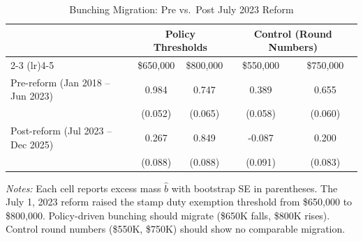 \begin{table}[htbp]
\centering
\begin{threeparttable}
\caption{Bunching Migration: Pre vs.\ Post July 2023 Reform}
\label{tab:migration}
\begin{tabular}{lcccc}
\hline\hline
 & \multicolumn{2}{c}{Policy Thresholds} & \multicolumn{2}{c}{Control (Round Numbers)} \\
\cmidrule(lr){2-3} \cmidrule(lr){4-5}
 & \$650,000 & \$800,000 & \$550,000 & \$750,000 \\
\hline
Pre-reform (Jan 2018 -- Jun 2023) & 0.984 & 0.747 & 0.389 & 0.655 \\
 & (0.052) & (0.065) & (0.058) & (0.060) \\
\addlinespace
Post-reform (Jul 2023 -- Dec 2025) & 0.267 & 0.849 & -0.087 & 0.200 \\
 & (0.088) & (0.088) & (0.091) & (0.083) \\
\hline\hline
\end{tabular}
\begin{tablenotes}
\item \textit{Notes:} Each cell reports excess mass $\hat{b}$ with bootstrap SE in parentheses.
The July 1, 2023 reform raised the stamp duty exemption threshold from \$650,000 to \$800,000.
Policy-driven bunching should migrate (\$650K falls, \$800K rises).
Control round numbers (\$550K, \$750K) should show no comparable migration.
\end{tablenotes}
\end{threeparttable}
\end{table}

